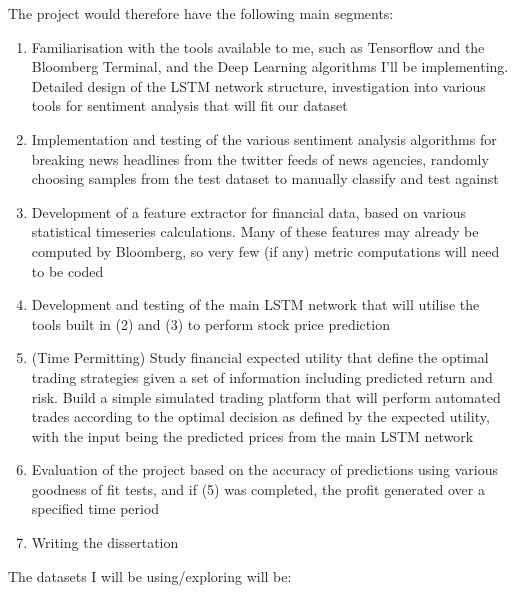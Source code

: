 \documentclass[12pt,a4paper,twoside,openright]{report}
\begin{document}
The project would therefore have the following main segments:

\begin{enumerate}
\item
Familiarisation with the tools available to me, such as Tensorflow and the Bloomberg
Terminal, and the Deep Learning algorithms I’ll be implementing. Detailed design of the
LSTM network structure, investigation into various tools for sentiment analysis that will
fit our dataset

\item
Implementation and testing of the various sentiment analysis algorithms for breaking
news headlines from the twitter feeds of news agencies, randomly choosing samples from
the test dataset to manually classify and test against

\item
Development of a feature extractor for financial data, based on various statistical timeseries
calculations. Many of these features may already be computed by Bloomberg, so
very few (if any) metric computations will need to be coded

\item
Development and testing of the main LSTM network that will utilise the tools built in (2)
and (3) to perform stock price prediction

\item
(Time Permitting) Study financial expected utility that define the optimal trading
strategies given a set of information including predicted return and risk. Build a simple
simulated trading platform that will perform automated trades according to the optimal
decision as defined by the expected utility, with the input being the predicted prices from
the main LSTM network

\item
Evaluation of the project based on the accuracy of predictions using various goodness of
fit tests, and if (5) was completed, the profit generated over a specified time period

\item
Writing the dissertation
\end{enumerate}
\vspace{5mm}

The datasets I will be using/exploring will be:
\end{document}
